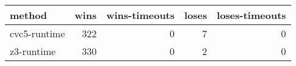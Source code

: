 \begin{tabular}{lrrrr}
\hline
 method       &   wins &   wins-timeouts &   loses &   loses-timeouts \\
\hline
 cvc5-runtime &    322 &               0 &       7 &                0 \\
 z3-runtime   &    330 &               0 &       2 &                0 \\
\hline
\end{tabular}
